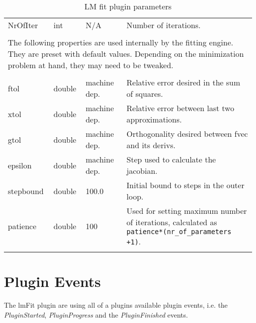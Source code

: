 \begin{landscape}
\begin{longtable}{p{4cm} l p{3cm}  p{10cm}}
NrOfIter                        &   int                 & N/A    &   Number of iterations. \\[12pt]
\\[2pt]                                                               
\multicolumn{4}{p{19cm}}{The following properties are used internally by the fitting engine. They are preset with default values. Depending on the minimization problem at hand, they may need to be tweaked. } \\[12pt]
\hline %
\\[2pt]                                                               
ftol                            &   double              & machine dep.          &   Relative error desired in the sum of squares. \\
xtol                            &   double              & machine dep.          &   Relative error between last two approximations. \\
gtol                            &   double              & machine dep.          &   Orthogonality desired between fvec and its derivs. \\
epsilon                         &   double              & machine dep.          &   Step used to calculate the jacobian. \\
stepbound                       &   double              & 100.0                 &   Initial bound to steps in the outer loop. \\
patience                        &   double              & 100                   &   Used for setting maximum number of iterations, calculated as \verb|patience*(nr_of_parameters +1)|. \\
                                                        
\hline %
\caption{LM fit plugin parameters} 
\label{table:lmfitPluginParameters} 
\end{longtable}

\end{landscape}

\section{Plugin Events}
The lmFit plugin are using all of a plugins available plugin events, i.e. the \emph{PluginStarted}, \emph{PluginProgress} and the \emph{PluginFinished} events.

